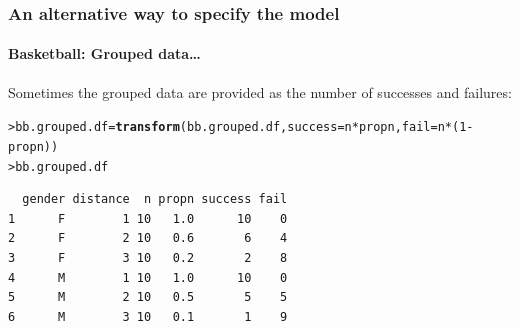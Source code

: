 \documentclass{beamer}\usepackage[]{graphicx}\usepackage[]{xcolor}
\makeatletter
\newcommand{\hlnum}[1]{\textcolor[rgb]{0.686,0.059,0.569}{#1}}%
\newcommand{\hlopt}[1]{\textcolor[rgb]{0,0,0}{#1}}%
\newcommand{\hlstd}[1]{\textcolor[rgb]{0.345,0.345,0.345}{#1}}%
\newcommand{\hlkwb}[1]{\textcolor[rgb]{0.69,0.353,0.396}{#1}}%
\newcommand{\hlkwc}[1]{\textcolor[rgb]{0.333,0.667,0.333}{#1}}%
\newcommand{\hlkwd}[1]{\textcolor[rgb]{0.737,0.353,0.396}{\textbf{#1}}}%
\newenvironment{kframe}{%
 \def\at@end@of@kframe{}%
 \ifinner\ifhmode%
  \def\at@end@of@kframe{\end{minipage}}%
  \begin{minipage}{\columnwidth}%
 \fi\fi%
 \def\FrameCommand##1{\hskip\@totalleftmargin \hskip-\fboxsep
 \colorbox{shadecolor}{##1}\hskip-\fboxsep
     \hskip-\linewidth \hskip-\@totalleftmargin \hskip\columnwidth}%
 \MakeFramed {\advance\hsize-\width
   \@totalleftmargin\z@ \linewidth\hsize
   \@setminipage}}%
 {\par\unskip\endMakeFramed%
 \at@end@of@kframe}
\newenvironment{knitrout}{}{} %
\makeatother
\begin{document}
\begin{frame}[fragile]
\frametitle{An alternative way to specify the model}
\framesubtitle{Basketball: Grouped data\ldots}
Sometimes the grouped data are provided as the number of successes and failures:
\bigskip

\begin{knitrout}\scriptsize
{}\color{fgcolor}\begin{kframe}
\begin{alltt}
\hlstd{> }\hlstd{bb.grouped.df} \hlkwb{=} \hlkwd{transform}\hlstd{(bb.grouped.df,} \hlkwc{success}\hlstd{=n}\hlopt{*}\hlstd{propn,} \hlkwc{fail}\hlstd{=n}\hlopt{*}\hlstd{(}\hlnum{1}\hlopt{-}\hlstd{propn))}
\hlstd{> }\hlstd{bb.grouped.df}
\end{alltt}
\begin{verbatim}
  gender distance  n propn success fail
1      F        1 10   1.0      10    0
2      F        2 10   0.6       6    4
3      F        3 10   0.2       2    8
4      M        1 10   1.0      10    0
5      M        2 10   0.5       5    5
6      M        3 10   0.1       1    9
\end{verbatim}
\end{kframe}
\end{knitrout}
\end{frame}
\end{document}
